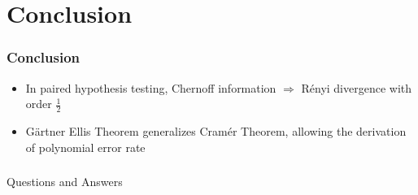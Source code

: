 \documentclass{beamer}
\begin{document}
\section{Conclusion}
\begin{frame}
\frametitle{Conclusion}
\begin{itemize}
\item In paired hypothesis testing, Chernoff information $\Rightarrow$ Rényi divergence with order $\frac{1}{2}$
\item Gärtner Ellis Theorem generalizes Cramér Theorem, allowing the derivation of polynomial error rate
\end{itemize}
\end{frame}

\begin{frame}
\frametitle{}
\begin{block}{}
\centering
{\Huge Questions and Answers}
\end{block}
\end{frame}
\end{document}
